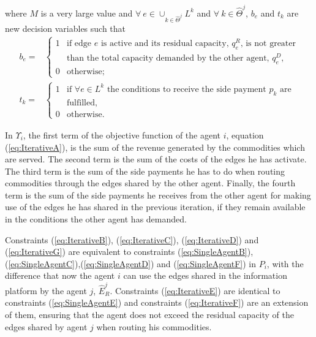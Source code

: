 \documentclass{article}
\begin{document}
where $M$ is a very large value  and $\forall\ e \in \cup_{k\in\widehat{\Theta}^j}L^k$ and $\forall\ k\in \widehat{\Theta}^j$, $b_e$ and $t_k$ are new decision variables such that
\[
\begin{array}{rl}
b_e = & \begin{cases}
    1 & \text{if edge } e \text{ is active and its residual capacity, } q_e^R\text{, is not greater} \\[-2pt]
    & \text{than the total capacity demanded by the other agent, } q_e^D,\\
    0 & \text{otherwise;}
\end{cases}  \\[20pt]
t_k = &\begin{cases}
    1 & \text{if } \forall e \in L^k \text{ the conditions to receive the side payment } p_k \text{ are} \\[-2pt]
    & \text{fulfilled},\\
    0 & \text{otherwise.}    
\end{cases}
\end{array}
\]

In $\Upsilon_i$, the first term of the objective function of the agent $i$, equation (\ref{eq:IterativeA}), is the sum of the revenue generated by the commodities which are served. The second term is the sum of the costs of the edges he has activate. The third term is the sum of the side payments he has to do when routing commodities through the edges shared by the other agent. Finally, the fourth term is the sum of the side payments he receives from the other agent for making use of the edges he has shared in the previous iteration, if they remain available in the conditions the other agent has demanded.

Constraints (\ref{eq:IterativeB}), (\ref{eq:IterativeC}), (\ref{eq:IterativeD}) and (\ref{eq:IterativeG}) are equivalent to constraints (\ref{eq:SingleAgentB}),(\ref{eq:SingleAgentC}),(\ref{eq:SingleAgentD}) and (\ref{eq:SingleAgentF}) in $P_i$, with the difference that now the agent $i$ can use the edges shared in the information platform by the agent $j$, $\widehat{E}_R^j$. Constraints (\ref{eq:IterativeE}) are identical to constraints (\ref{eq:SingleAgentE}) and constraints (\ref{eq:IterativeF}) are an extension of them, ensuring that the agent does not exceed the residual capacity of the edges shared by agent $j$ when routing his commodities.
\end{document}
